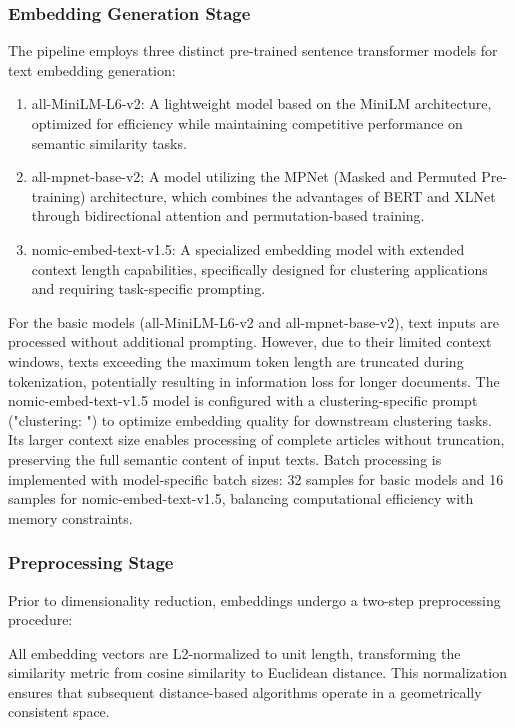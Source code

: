 \subsubsection{Embedding Generation Stage}
\label{sec:embed-gen}

The pipeline employs three distinct pre-trained sentence transformer models for text embedding generation:

\begin{enumerate}
    \item all-MiniLM-L6-v2: A lightweight model based on the MiniLM architecture, optimized for efficiency while maintaining competitive performance on semantic similarity tasks.
    \item all-mpnet-base-v2: A model utilizing the MPNet (Masked and Permuted Pre-training) architecture, which combines the advantages of BERT and XLNet through bidirectional attention and permutation-based training.
    \item nomic-embed-text-v1.5: A specialized embedding model with extended context length capabilities, specifically designed for clustering applications and requiring task-specific prompting.
\end{enumerate}

For the basic models (all-MiniLM-L6-v2 and all-mpnet-base-v2), text inputs are processed without additional prompting. However, due to their limited context windows, texts exceeding the maximum token length are truncated during tokenization, potentially resulting in information loss for longer documents.
The nomic-embed-text-v1.5 model is configured with a clustering-specific prompt ("clustering: ") to optimize embedding quality for downstream clustering tasks. Its larger context size enables processing of complete articles without truncation, preserving the full semantic content of input texts.
Batch processing is implemented with model-specific batch sizes: 32 samples for basic models and 16 samples for nomic-embed-text-v1.5, balancing computational efficiency with memory constraints.

\subsubsection{Preprocessing Stage}
\label{sec:preprocessing}

Prior to dimensionality reduction, embeddings undergo a two-step preprocessing procedure:

All embedding vectors are L2-normalized to unit length, transforming the similarity metric from cosine similarity to Euclidean distance. This normalization ensures that subsequent distance-based algorithms operate in a geometrically consistent space.

